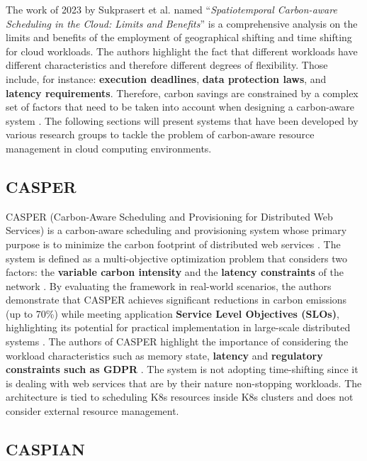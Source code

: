 The work of 2023 by Sukprasert et al. named ``\textit{Spatiotemporal Carbon-aware Scheduling in the Cloud: Limits and Benefits}'' \cite{10.1145/3599733.3606301} is a comprehensive analysis on the limits and benefits of the employment of geographical shifting and time shifting for cloud workloads.
The authors highlight the fact that different workloads have different characteristics and therefore different degrees of flexibility. Those include, for instance: \textbf{execution deadlines}, \textbf{data protection laws}, and \textbf{latency requirements}. Therefore, carbon savings are constrained by a complex set of factors that need to be taken into account when designing a carbon-aware system \cite{10.1145/3599733.3606301}.
The following sections will present systems that have been developed by various research groups to tackle the problem of carbon-aware resource management in cloud computing environments.

\subsection{CASPER}

CASPER (Carbon-Aware Scheduling and Provisioning for Distributed Web Services) is a carbon-aware scheduling and provisioning system whose primary purpose is to minimize the carbon footprint of distributed web services \cite{Souza_2023}.
The system is defined as a multi-objective optimization problem that considers two factors: the \textbf{variable carbon intensity} and the \textbf{latency constraints} of the network \cite{Souza_2023}.
By evaluating the framework in real-world scenarios, the authors demonstrate that CASPER achieves significant reductions in carbon emissions (up to 70\%) while meeting application \textbf{Service Level Objectives (SLOs)}, highlighting its potential for practical implementation in large-scale distributed systems \cite{Souza_2023}.
The authors of CASPER highlight the importance of considering the workload characteristics such as memory state, \textbf{latency} and \textbf{regulatory constraints such as GDPR} \cite{Souza_2023}.
The system is not adopting time-shifting since it is dealing with web services that are by their nature non-stopping workloads. The architecture is tied to scheduling K8s resources inside K8s clusters and does not consider external resource management.

\subsection{CASPIAN}

